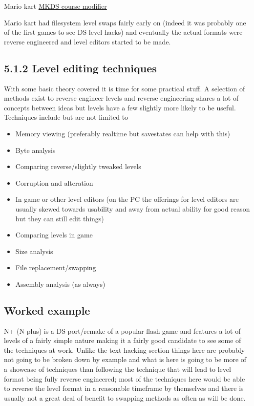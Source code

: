 \documentclass[
]{book}
\providecommand{\tightlist}{%
  \setlength{\itemsep}{0pt}\setlength{\parskip}{0pt}}
\begin{document}
Mario kart \href{http://gbatemp.net/topic/299444-mkds-course-modifier/}{MKDS course modifier}

Mario kart had filesystem level swaps fairly early on (indeed it was probably one of the first games to see DS level hacks) and eventually the actual formats were reverse engineered and level editors started to be made.

\hypertarget{level-editing-techniques}{%
\subsection{5.1.2 Level editing techniques}\label{level-editing-techniques}}

With some basic theory covered it is time for some practical stuff. A selection of methods exist to reverse engineer levels and reverse engineering shares a lot of concepts between ideas but levels have a few slightly more likely to be useful. Techniques include but are not limited to

\begin{itemize}
\tightlist
\item
  Memory viewing (preferably realtime but savestates can help with this)
\item
  Byte analysis
\item
  Comparing reverse/slightly tweaked levels
\item
  Corruption and alteration
\item
  In game or other level editors (on the PC the offerings for level editors are usually skewed towards usability and away from actual ability for good reason but they can still edit things)
\item
  Comparing levels in game
\item
  Size analysis
\item
  File replacement/swapping
\item
  Assembly analysis (as always)
\end{itemize}

\hypertarget{worked-example-1}{%
\subsection{Worked example}\label{worked-example-1}}

N+ (N plus) is a DS port/remake of a popular flash game and features a lot of levels of a fairly simple nature making it a fairly good candidate to see some of the techniques at work. Unlike the text hacking section things here are probably not going to be broken down by example and what is here is going to be more of a showcase of techniques than following the technique that will lead to level format being fully reverse engineered; most of the techniques here would be able to reverse the level format in a reasonable timeframe by themselves and there is usually not a great deal of benefit to swapping methods as often as will be done.
\end{document}
